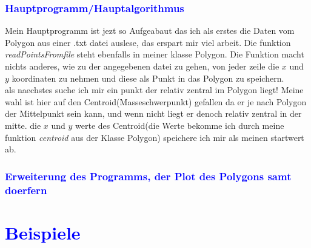 \documentclass{article}
\begin{document}
\subsubsection{\textcolor{blue}{Hauptprogramm/Hauptalgorithmus}}
Mein Hauptprogramm ist jezt so Aufgeabaut das ich als erstes die Daten vom Polygon aus einer .txt datei auslese, das erspart mir viel arbeit. Die funktion \textit{readPointsFromfile} steht ebenfalls in meiner klasse Polygon. Die Funktion macht nichts anderes, wie zu der angegebenen datei zu gehen, von jeder zeile die $x$ und $y$ koordinaten zu nehmen und diese als Punkt in das Polygon zu speichern. 
\\
als naechstes suche ich mir ein punkt der relativ zentral im Polygon liegt! Meine wahl ist hier auf den Centroid(Masseschwerpunkt) gefallen da er je nach Polygon der Mittelpunkt sein kann, und wenn nicht liegt er denoch relativ zentral in der mitte. die $x$ und $y$ werte des Centroid(die Werte bekomme ich durch meine funktion \textit{centroid} aus der Klasse Polygon) speichere ich mir als meinen startwert ab.
\subsubsection{\textcolor{blue}{Erweiterung des Programms, der Plot des Polygons samt doerfern}}
\begin{center}

\end{center}
\newpage
\section{\textcolor{blue}{Beispiele}}
\end{document}
